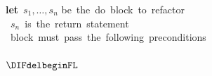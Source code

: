 \begin{figure}[t]
\textbf{let}\ $s_1, \ldots, s_n$ be\ the\ do\ block\ to\ refactor\\
\DIFdelbeginFL {}\DIFdelendFL \ \DIFaddbeginFL \DIFaddFL{~\ ~\ ~\ ~\       }\DIFaddendFL $s_n$\ is\ the\ return\ statement\DIFaddbeginFL {}\DIFaddendFL \\
\DIFdelbeginFL {}\DIFdelendFL \DIFaddbeginFL {}\DIFaddendFL \ block\ must\ pass\ the\ following\ preconditions\\
\DIFdelbeginFL %
\DIFdelendFL \DIFaddbeginFL \\
\DIFaddendFL \begin{math}
\DIFdelbeginFL %

\end{math}
\end{figure}
